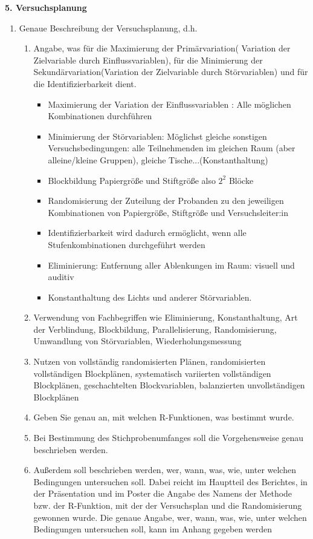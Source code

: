 \documentclass[ ngerman, fontsize= 12pt, paper=a4, headings=big, titlepage=true]{article}
\begin{document}
\textbf{5. Versuchsplanung}
\begin{enumerate}[-]
	\item  Genaue Beschreibung der Versuchsplanung, d.h.
	\begin{enumerate}[*]
		\item Angabe, was für die Maximierung der Primärvariation( Variation der Zielvariable durch Einflussvariablen), für die Minimierung der
		Sekundärvariation(Variation der Zielvariable durch Störvariablen) und für die Identifizierbarkeit dient.
		\begin{itemize}
			\item Maximierung der Variation  der Einflussvariablen : Alle möglichen Kombinationen durchführen\\
			\item Minimierung der Störvariablen: Möglichst gleiche sonstigen Versuchsbedingungen: alle Teilnehmenden im gleichen Raum (aber alleine/kleine Gruppen), gleiche Tische...(Konstanthaltung)
			\item Blockbildung Papiergröße und Stiftgröße  also $2^2$ Blöcke 
			\item Randomisierung der Zuteilung der Probanden  zu den jeweiligen Kombinationen von  Papiergröße, Stiftgröße und Versuchsleiter:in
			\item Identifizierbarkeit wird dadurch ermöglicht, wenn alle Stufenkombinationen durchgeführt werden
			\item Eliminierung: Entfernung aller Ablenkungen im Raum: visuell und auditiv
			\item Konstanthaltung des Lichts und anderer Störvariablen.
		\end{itemize}

		\item Verwendung von Fachbegriffen wie Eliminierung, Konstanthaltung, Art der Verblindung, Blockbildung, Parallelisierung, Randomisierung, Umwandlung von Störvariablen, Wiederholungsmessung
		\item Nutzen von vollständig randomisierten Plänen, randomisierten vollständigen Blockplänen, systematisch variierten vollständigen Blockplänen, geschachtelten Blockvariablen, balanzierten unvollständigen Blockplänen

		\item Geben Sie genau an, mit welchen R-Funktionen, was bestimmt wurde.
		\item Bei Bestimmung des Stichprobenumfanges soll die Vorgehensweise genau beschrieben
		werden. 
		\item Außerdem soll beschrieben werden, wer, wann, was, wie, unter welchen Bedingungen
		untersuchen soll. Dabei reicht im Hauptteil des Berichtes, in der Präsentation und
		im Poster die Angabe des Namens der Methode bzw. der R-Funktion, mit der
		der Versuchsplan und die Randomisierung gewonnen wurde. Die genaue Angabe,
		wer, wann, was, wie, unter welchen Bedingungen untersuchen soll, kann im Anhang
		gegeben werden
		

\end{enumerate}
\end{enumerate}
\end{document}
